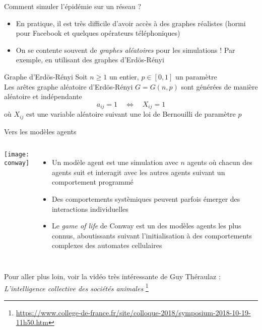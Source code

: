 \documentclass[10pt]{beamer}
\begin{document}
\begin{frame}{Comment simuler l'épidémie sur un réseau ?}
  \begin{itemize}
    \item En pratique, il est très difficile d'avoir accès à des graphes
      réalistes (hormi pour Facebook et quelques opérateurs téléphoniques)
    \item On se contente souvent de \emph{graphes aléatoires} pour les simulations !
      Par exemple, en utilisant des graphes d'Erdös-Rényi
  \end{itemize}

  \begin{block}{Graphe d'Erdös-Rényi}
    Soit $n\geq 1$ un entier, $p \in [0, 1]$ un paramètre\\
    Les arêtes graphe aléatoire d'Erdös-Rényi $G = G(n, p)$ sont générées
    de manière aléatoire et indépendante
    \[
      a_{ij} = 1 \quad \iff \quad X_{ij} = 1
    \]
    où $X_{ij}$ est une variable aléatoire suivant une loi de Bernouilli de paramètre $p$
  \end{block}
\end{frame}

\begin{frame}{Vers les modèles agents}

  {\footnotesize
    \begin{columns}
      \texttt{[image: conway]}
      \begin{itemize}
        \item Un modèle agent est une simulation avec $n$ agents où
          chacun des agents suit et interagit avec les autres agents suivant
          un comportement programmé
        \item Des comportements systèmiques peuvent parfois émerger des interactions
          individuelles
        \item Le \emph{game of life} de Conway est un des modèles agents les plus connus,
          aboutissants suivant l'initialisation à des comportements complexes des
          automates cellulaires
      \end{itemize}

    \end{columns}

    \vspace{1cm}
    Pour aller plus loin, voir la vidéo très intéressante de Guy Théraulaz : \emph{L'intelligence collective des sociétés animales}
    \footnote{
      \url{https://www.college-de-france.fr/site/colloque-2018/symposium-2018-10-19-11h50.htm}
    }
  }
\end{frame}
\end{document}

